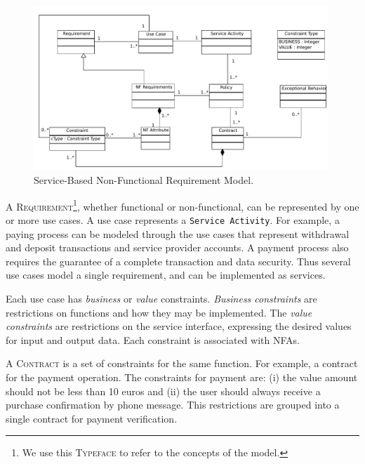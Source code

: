 

\begin{figure}  
\centering  
\includegraphics[width=0.99\textwidth]{chapters/state_ofthe_art/figs/contractModel.pdf}
\caption{Service-Based Non-Functional Requirement Model.}
\label{fig:NRFmodel} 
\end{figure}


A \textsc{Requirement}\footnote{We use this \textsc{Typeface} to refer to the
concepts of the model.}, whether functional or non-functional, can be
represented by one or more use cases. A use case represents a \texttt{Service Activity}. For example, a paying process can be modeled through the use cases
that represent withdrawal and deposit transactions and service provider
accounts. A payment process also requires the guarantee of a complete
transaction and data security. Thus several use cases model a single
requirement, and can be implemented as services.
% 
 
Each use case has \textit{business} or
\textit{value} constraints. \textit{Business constraints} are restrictions on
functions and how they may be implemented. The \textit{value constraints} are restrictions on
the service interface, expressing the desired values for input and output data.
Each constraint is associated with NFAs.

A \textsc{Contract} is a set of constraints for the same function. For example,
a contract for the payment operation. The constraints for payment are: (i) the
value amount should not be less than 10 euros and (ii) the user should always
receive a purchase confirmation by phone message. This restrictions are
grouped into a single contract for payment verification. 

